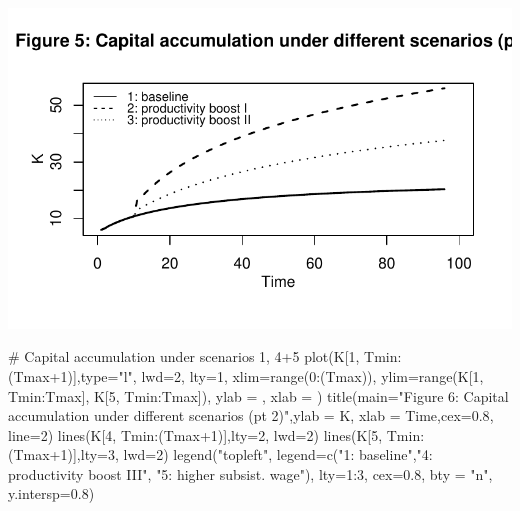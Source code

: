 \documentclass[
  letterpaper,
  DIV=11,
  numbers=noendperiod]{scrreprt}
\newenvironment{Shaded}{\begin{snugshade}}{\end{snugshade}}
\newcommand{\AttributeTok}[1]{\textcolor[rgb]{0.40,0.45,0.13}{#1}}
\newcommand{\CommentTok}[1]{\textcolor[rgb]{0.37,0.37,0.37}{#1}}
\newcommand{\DecValTok}[1]{\textcolor[rgb]{0.68,0.00,0.00}{#1}}
\newcommand{\FloatTok}[1]{\textcolor[rgb]{0.68,0.00,0.00}{#1}}
\newcommand{\FunctionTok}[1]{\textcolor[rgb]{0.28,0.35,0.67}{#1}}
\newcommand{\NormalTok}[1]{\textcolor[rgb]{0.00,0.23,0.31}{#1}}
\newcommand{\SpecialCharTok}[1]{\textcolor[rgb]{0.37,0.37,0.37}{#1}}
\newcommand{\StringTok}[1]{\textcolor[rgb]{0.13,0.47,0.30}{#1}}
\begin{document}
\includegraphics{a_ricardian_two_sector_model_files/figure-pdf/ricardo2_3-1.pdf}

\begin{Shaded}
\begin{Highlighting}[]
\CommentTok{\# Capital accumulation under scenarios 1, 4+5}
\FunctionTok{plot}\NormalTok{(K[}\DecValTok{1}\NormalTok{, Tmin}\SpecialCharTok{:}\NormalTok{(Tmax}\SpecialCharTok{+}\DecValTok{1}\NormalTok{)],}\AttributeTok{type=}\StringTok{"l"}\NormalTok{, }\AttributeTok{lwd=}\DecValTok{2}\NormalTok{, }\AttributeTok{lty=}\DecValTok{1}\NormalTok{, }\AttributeTok{xlim=}\FunctionTok{range}\NormalTok{(}\DecValTok{0}\SpecialCharTok{:}\NormalTok{(Tmax)), }\AttributeTok{ylim=}\FunctionTok{range}\NormalTok{(K[}\DecValTok{1}\NormalTok{, Tmin}\SpecialCharTok{:}\NormalTok{Tmax], K[}\DecValTok{5}\NormalTok{, Tmin}\SpecialCharTok{:}\NormalTok{Tmax]), }\AttributeTok{ylab =} \StringTok{\textquotesingle{}\textquotesingle{}}\NormalTok{, }\AttributeTok{xlab =} \StringTok{\textquotesingle{}\textquotesingle{}}\NormalTok{)}
\FunctionTok{title}\NormalTok{(}\AttributeTok{main=}\StringTok{"Figure 6: Capital accumulation under different scenarios (pt 2)"}\NormalTok{,}\AttributeTok{ylab =} \StringTok{\textquotesingle{}K\textquotesingle{}}\NormalTok{, }\AttributeTok{xlab =} \StringTok{\textquotesingle{}Time\textquotesingle{}}\NormalTok{,}\AttributeTok{cex=}\FloatTok{0.8}\NormalTok{, }\AttributeTok{line=}\DecValTok{2}\NormalTok{)}
\FunctionTok{lines}\NormalTok{(K[}\DecValTok{4}\NormalTok{, Tmin}\SpecialCharTok{:}\NormalTok{(Tmax}\SpecialCharTok{+}\DecValTok{1}\NormalTok{)],}\AttributeTok{lty=}\DecValTok{2}\NormalTok{, }\AttributeTok{lwd=}\DecValTok{2}\NormalTok{)}
\FunctionTok{lines}\NormalTok{(K[}\DecValTok{5}\NormalTok{, Tmin}\SpecialCharTok{:}\NormalTok{(Tmax}\SpecialCharTok{+}\DecValTok{1}\NormalTok{)],}\AttributeTok{lty=}\DecValTok{3}\NormalTok{, }\AttributeTok{lwd=}\DecValTok{2}\NormalTok{)}
\FunctionTok{legend}\NormalTok{(}\StringTok{"topleft"}\NormalTok{, }\AttributeTok{legend=}\FunctionTok{c}\NormalTok{(}\StringTok{"1: baseline"}\NormalTok{,}\StringTok{"4: productivity boost III"}\NormalTok{, }\StringTok{"5: higher subsist. wage"}\NormalTok{), }\AttributeTok{lty=}\DecValTok{1}\SpecialCharTok{:}\DecValTok{3}\NormalTok{, }\AttributeTok{cex=}\FloatTok{0.8}\NormalTok{, }\AttributeTok{bty =} \StringTok{"n"}\NormalTok{, }\AttributeTok{y.intersp=}\FloatTok{0.8}\NormalTok{)}
\end{Highlighting}
\end{Shaded}
\end{document}
